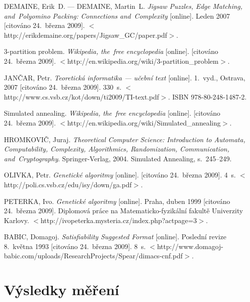 \documentclass[11pt, titlepage]{report}
\begin{document}
\begin{thebibliography}{9}

 DEMAINE, Erik~D. --- DEMAINE, Martin~L. \emph{Jigsaw Puzzles, Edge Matching, and~Polyomino Packing: Connections and~Complexity} [online]. Leden 2007 [citováno 24.~března 2009]. $<$http://erikdemaine.org/papers/Jigsaw\_GC/paper.pdf$>$.

 3-partition problem. \emph{Wikipedia, the~free encyclopedia} [online]. [citováno 24.~března 2009]. $<$http://en.wikipedia.org/wiki/3-partition\_problem$>$.

 JANČAR, Petr. \emph{Teoretická informatika --- učební text} [online]. 1.~vyd., Ostrava, 2007 [citováno 24.~března 2009]. 330~s. $<$http://www.cs.vsb.cz/kot/down/ti2009/TI-text.pdf$>$. ISBN 978-80-248-1487-2.

 Simulated annealing. \emph{Wikipedia, the~free encyclopedia} [online]. [citováno 24.~března 2009]. $<$http://en.wikipedia.org/wiki/Simulated\_annealing$>$.

 HROMKOVIČ, Juraj. \emph{Theoretical Computer Science: Introduction to Automata, Computability, Complexity, Algorithmics, Randomization, Communication, and~Cryptography}. Springer-Verlag, 2004. Simulated Annealing, s.~245--249.

 OLIVKA, Petr. \emph{Genetické algoritmy} [online]. [citováno 24.~března 2009]. 4~s. $<$http://poli.cs.vsb.cz/edu/isy/down/ga.pdf$>$.

 PETERKA, Ivo. \emph{Genetické algoritmy} [online]. Praha, duben 1999 [citováno 24.~března 2009]. Diplomová práce na Matematicko-fyzikální fakultě Univerzity Karlovy. $<$http://ivopeterka.mysteria.cz/index.php?actpage=3$>$.

 BABIC, Domagoj. \emph{Satisfiability Suggested Format} [online]. Poslední revize 8.~května 1993 [citováno 24.~března 2009]. 8~s. $<$http://www.domagoj-babic.com/uploads/ResearchProjects/Spear/dimacs-cnf.pdf$>$.

\end{thebibliography}


\renewcommand{\appendixname}{Příloha}
\appendix

\chapter{Výsledky měření}
\label{ch:logy}

\newpage
\end{document}
